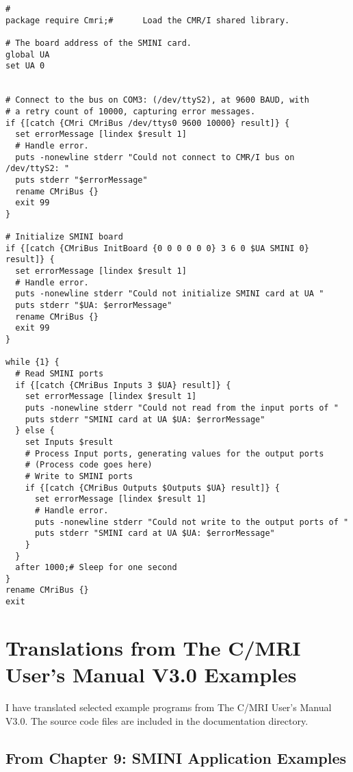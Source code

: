 \begin{lstlisting}[caption={Using the CMR/I from Tcl, more realistic version},
		   label=lst:CMRI:Tcl2]
#
package require Cmri;#		Load the CMR/I shared library.

# The board address of the SMINI card.
global UA
set UA 0


# Connect to the bus on COM3: (/dev/ttyS2), at 9600 BAUD, with
# a retry count of 10000, capturing error messages.
if {[catch {CMri CMriBus /dev/ttys0 9600 10000} result]} {
  set errorMessage [lindex $result 1]
  # Handle error.
  puts -nonewline stderr "Could not connect to CMR/I bus on /dev/ttyS2: "
  puts stderr "$errorMessage"
  rename CMriBus {}
  exit 99
}

# Initialize SMINI board
if {[catch {CMriBus InitBoard {0 0 0 0 0 0} 3 6 0 $UA SMINI 0} result]} {
  set errorMessage [lindex $result 1]
  # Handle error.
  puts -nonewline stderr "Could not initialize SMINI card at UA "
  puts stderr "$UA: $errorMessage"
  rename CMriBus {}
  exit 99
}

while {1} {
  # Read SMINI ports
  if {[catch {CMriBus Inputs 3 $UA} result]} {
    set errorMessage [lindex $result 1]
    puts -nonewline stderr "Could not read from the input ports of "
    puts stderr "SMINI card at UA $UA: $errorMessage"
  } else {
    set Inputs $result
    # Process Input ports, generating values for the output ports
    # (Process code goes here)
    # Write to SMINI ports
    if {[catch {CMriBus Outputs $Outputs $UA} result]} {
      set errorMessage [lindex $result 1]
      # Handle error.
      puts -nonewline stderr "Could not write to the output ports of "
      puts stderr "SMINI card at UA $UA: $errorMessage"
    }
  }
  after 1000;# Sleep for one second
}
rename CMriBus {} 
exit 
\end{lstlisting} 


\section{Translations from The C/MRI User's Manual V3.0 Examples}

I have translated selected example programs from The C/MRI User's Manual
V3.0\cite{Chubb03}.  The source code files are included in the
documentation directory.

\subsection{From Chapter 9: SMINI Application Examples}



